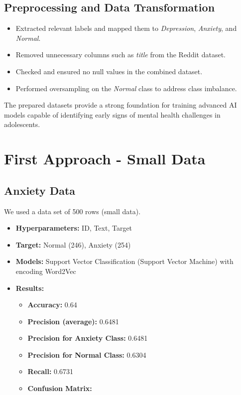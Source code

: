 \documentclass[runningheads,a4paper,11pt]{report}
\begin{document}
\subsection{Preprocessing and Data Transformation}
\label{section:preprocessing}
\begin{itemize}
    \item Extracted relevant labels and mapped them to \textit{Depression}, \textit{Anxiety}, and \textit{Normal}.
    \item Removed unnecessary columns such as \textit{title} from the Reddit dataset.
    \item Checked and ensured no null values in the combined dataset.
    \item Performed oversampling on the \textit{Normal} class to address class imbalance.
\end{itemize}

The prepared datasets provide a strong foundation for training advanced AI models capable of identifying early signs of mental health challenges in adolescents.

\vspace{1cm}

\section{First Approach - Small Data}
\label{section:first}

\subsection{Anxiety Data}
\label{section:anxiety}
We used a data set of 500 rows (small data).
\begin{itemize}
    \item \textbf{Hyperparameters:} ID, Text, Target
    \item \textbf{Target:} Normal (246), Anxiety (254)
    \item \textbf{Models:} Support Vector Classification (Support Vector Machine) with encoding Word2Vec
    \item \textbf{Results:}
    \begin{itemize}
        \item \textbf{Accuracy:} 0.64
        \item \textbf{Precision (average):} 0.6481
        \item \textbf{Precision for Anxiety Class:} 0.6481
        \item \textbf{Precision for Normal Class:} 0.6304
        \item \textbf{Recall:} 0.6731
        \item \textbf{Confusion Matrix:}
    \end{itemize}
\end{itemize}
\end{document}
